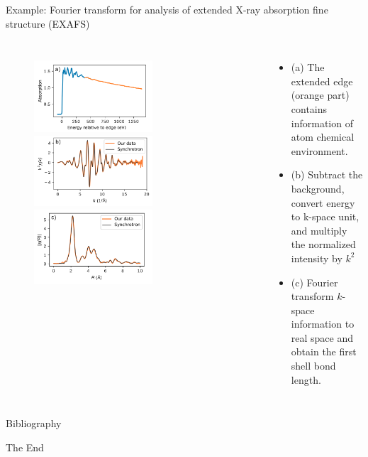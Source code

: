 \documentclass[aspectratio=169]{beamer}
\begin{document}
\begin{frame}{Example: Fourier transform for analysis of extended X-ray absorption fine structure (EXAFS)}
    
    \begin{columns}
    \begin{figure}
        \centering
    \includegraphics[width=0.6\textwidth]{figures/EXAFS-1.png}
    \includegraphics[width=0.6\textwidth]{figures/EXAFS-2.png}
    \includegraphics[width=0.6\textwidth]{figures/EXAFS-3.png}
    \end{figure}
    \begin{itemize}
        \item (a) The extended edge (orange part) contains information of atom chemical environment.
        \item (b) Subtract the background, convert energy to k-space unit, and multiply the normalized intensity by $k^2$
        \item (c) Fourier transform $k$-space information to real space and obtain the first shell bond length. 
    \end{itemize}
    \end{columns}
    
\end{frame} 


\begin{frame}{Bibliography}
    
    
\end{frame}


\begin{frame}
    \Huge{\centerline{The End}}
\end{frame}
\end{document}
